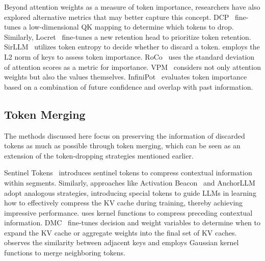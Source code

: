 Beyond attention weights as a measure of token importance, researchers have also explored alternative metrics that may better capture this concept. DCP~\citep{anagnostidis2024dynamic} fine-tunes a low-dimensional QK mapping to determine which tokens to drop. Similarly, Locret~\citep{huang2024locret} fine-tunes a new retention head to prioritize token retention. SirLLM~\citep{yao2024sirllm} utilizes token entropy to decide whether to discard a token. \citet{devoto2024simple} employs the L2 norm of keys to assess token importance. RoCo~\citep{ren2024efficacy} uses the standard deviation of attention scores as a metric for importance. VPM~\citep{guo2024attention} considers not only attention weights but also the values themselves. InfiniPot~\citep{guo2024attention} evaluates token importance based on a combination of future confidence and overlap with past information.

\subsection{Token Merging}\label{sec3_2}

The methods discussed here focus on preserving the information of discarded tokens as much as possible through token merging, which can be seen as an extension of the token-dropping strategies mentioned earlier.

Sentinel Tokens~\citep{ren2023context} introduces sentinel tokens to compress contextual information within segments. Similarly, approaches like Activation Beacon~\citep{zhang2024long} and AnchorLLM~\citep{pang2024anchor} adopt analogous strategies, introducing special tokens to guide LLMs in learning how to effectively compress the KV cache during training, thereby achieving impressive performance. \citet{dong2024get} uses kernel functions to compress preceding contextual information. DMC~\citep{nawrot2024dynamic} fine-tunes decision and weight variables to determine when to expand the KV cache or aggregate weights into the final set of KV caches. \citet{wang2024model} observes the similarity between adjacent keys and employs Gaussian kernel functions to merge neighboring tokens.



